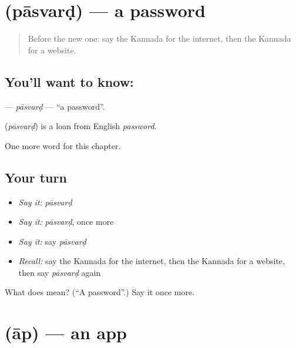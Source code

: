 \section[\texorpdfstring{\kn{ಪಾಸ್ವರ್ಡ್} (pāsvarḍ)}{ಪಾಸ್ವರ್ಡ್ (pāsvarḍ)}]{ (pāsvarḍ) — a password}

\label{lesson:KA-C264-pasvard}



\begin{quote}
Before the new one: say the Kannada for the internet, then the Kannada for a website.
\end{quote}

\subsection*{You'll want to know: }
\textbf{} — \emph{pāsvarḍ} — \textquotedblleft{}a password\textquotedblright{}.

\begin{cousinweb}
\textbf{} (\emph{pāsvarḍ}) is a loan from English \emph{password}.
\end{cousinweb}

\begin{grammarlens}[title={What you've built}]
One more word for this chapter.
\end{grammarlens}

\subsection*{Your turn}
\begin{itemize}
\raggedright
  \item \emph{Say it:} \emph{pāsvarḍ}
  \item \emph{Say it:} \emph{pāsvarḍ}, once more
  \item \emph{Say it:} say \emph{pāsvarḍ}
  \item \emph{Recall:} say the Kannada for the internet, then the Kannada for a website, then say \emph{pāsvarḍ} again
\end{itemize}

\begin{tcolorbox}[breakable,colback=teal!4,colframe=teal!35!black,title={Before you move on}]
What does  mean? (\textquotedblleft{}A password\textquotedblright{}.) Say it once more.
\end{tcolorbox}
\section[\texorpdfstring{\kn{ಆಪ್} (āp)}{ಆಪ್ (āp)}]{ (āp) — an app}

